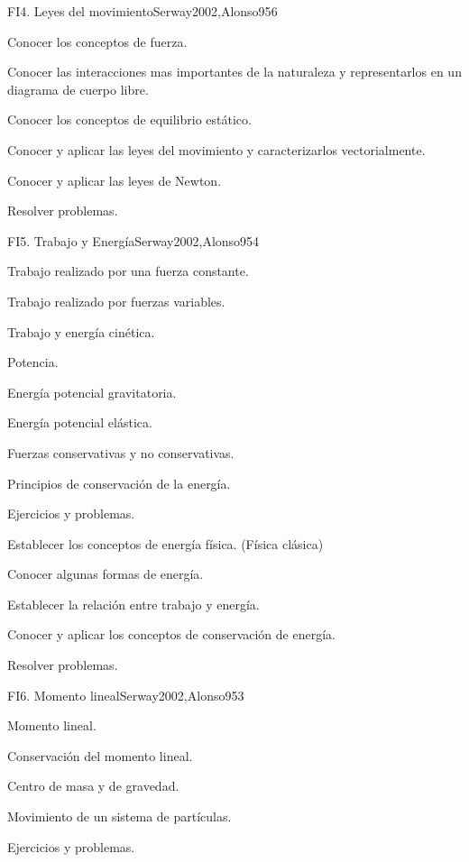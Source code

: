 \begin{sumilla}
\begin{unit}{FI4. Leyes del movimiento}{Serway2002,Alonso95}{6}
   \begin{objetivos}
      \item Conocer los conceptos de fuerza.
      \item Conocer las interacciones mas importantes de la naturaleza y representarlos en un diagrama de cuerpo libre.
      \item Conocer los conceptos de equilibrio est\'atico.
      \item Conocer y aplicar las leyes del movimiento y caracterizarlos vectorialmente.
      \item Conocer y aplicar las leyes de Newton.
      \item Resolver problemas.
   \end{objetivos}
\end{unit}

\begin{unit}{FI5. Trabajo y Energ\'ia}{Serway2002,Alonso95}{4}
\begin{topicos}
	\item Trabajo realizado por una fuerza constante.
	\item Trabajo realizado por fuerzas variables.
	\item Trabajo y energ\'ia cin\'etica.
	\item Potencia.
	\item Energ\'ia potencial gravitatoria.
	\item Energ\'ia potencial el\'astica.
	\item Fuerzas conservativas y no conservativas.
	\item Principios de conservaci\'on de la energ\'ia.
	\item Ejercicios y problemas.
\end{topicos}

   \begin{objetivos}
      \item Establecer los conceptos de energ\'ia f\'isica. (F\'isica cl\'asica)
      \item Conocer algunas formas de energ\'ia.
      \item Establecer la relaci\'on entre trabajo y energ\'ia.
      \item Conocer y aplicar los conceptos de conservaci\'on de energ\'ia.
      \item Resolver problemas.
   \end{objetivos}
\end{unit}

\begin{unit}{FI6. Momento lineal}{Serway2002,Alonso95}{3}
\begin{topicos}
      \item Momento lineal.
      \item Conservaci\'on del momento lineal.
      \item Centro de masa y de gravedad.
      \item Movimiento de un sistema de part\'iculas.
      \item Ejercicios y problemas.
  \end{topicos}


\end{unit}
\end{sumilla}
